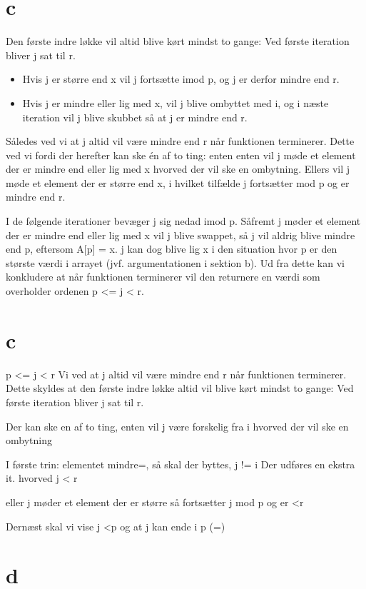 \documentclass[10pt,a4paper,danish]{article}
\begin{document}
\section{c}
Den første indre løkke vil altid blive kørt mindst to gange: Ved første iteration bliver j sat til r. 
\begin{itemize}
\item Hvis j er større end x vil j fortsætte imod p, og j er derfor mindre end r.\item Hvis j er mindre eller lig med x, vil j blive ombyttet med i, og i næste iteration vil j blive skubbet så at j er mindre end r. 
\end{itemize}
 Således ved vi at j altid vil være mindre end r når funktionen terminerer. Dette ved vi fordi der herefter kan ske én af to ting: enten enten vil j møde et element der er mindre end eller lig med x hvorved der vil ske en ombytning. Ellers vil j møde et element der er større end x, i hvilket tilfælde j fortsætter mod p og er mindre end r. 

I de følgende iterationer bevæger j sig nedad imod p. Såfremt j møder et element der er mindre end eller lig med x vil j blive swappet, så j vil aldrig blive mindre end p, eftersom A[p] = x. j kan dog blive lig x i den situation hvor p er den største værdi i arrayet (jvf. argumentationen i sektion b). Ud fra dette kan vi konkludere at når funktionen terminerer vil den returnere en værdi som overholder ordenen p <= j < r.

\section{c}

p <= j < r
Vi ved at j altid vil være mindre end r når funktionen terminerer. Dette skyldes at den første indre løkke altid vil blive kørt mindst to gange: Ved første iteration bliver j sat til r. 




Der kan ske en af to ting, enten vil j være forskelig fra i hvorved der vil ske en ombytning




I første trin:
elementet mindre=, så skal der byttes, j != i
Der udføres en ekstra it. hvorved j < r

eller
j møder et element der er større så fortsætter j mod p og er <r




Dernæst skal vi vise
j <p
og at j kan ende i p (=)


\section{d}
\end{document}
